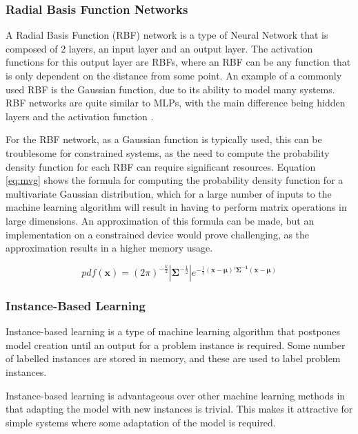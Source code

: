 \subsubsection{Radial Basis Function Networks}
A Radial Basis Function (RBF) network is a type of Neural Network that is composed of 2 layers, an input layer and an output layer. The activation functions for this output layer are RBFs, where an RBF can be any function that is only dependent on the distance from some point. An example of a commonly used RBF is the Gaussian function, due to its ability to model many systems. RBF networks are quite similar to MLPs, with the main difference being hidden layers and the activation function \cite{broomhead1988radial}.

For the RBF network, as a Gaussian function is typically used, this can be troublesome for constrained systems, as the need to compute the probability density function for each RBF can require significant resources. Equation \ref{eq:mvg} shows the formula for computing the probability density function for a multivariate Gaussian distribution, which for a large number of inputs to the machine learning algorithm will result in having to perform matrix operations in large dimensions. An approximation of this formula can be made, but an implementation on a constrained device would prove challenging, as the approximation results in a higher memory usage.

\begin{equation}
	pdf(\mathbf{x}) = (2\pi)^{-\frac{k}{2}}|\mathbf{\Sigma}^{-\frac{1}{2}}|e^{-\frac{1}{2}(\mathbf{x}-\mathbf{\mu})'\mathbf{\Sigma^{-1}}(\mathbf{x}-\mathbf{\mu})}
	\label{eq:mvg}
\end{equation}

\subsubsection{Instance-Based Learning}
Instance-based learning is a type of machine learning algorithm that postpones model creation until an output for a problem instance is required. Some number of labelled instances are stored in memory, and these are used to label problem instances.

Instance-based learning is advantageous over other machine learning methods in that adapting the model with new instances is trivial. This makes it attractive for simple systems where some adaptation of the model is required.

